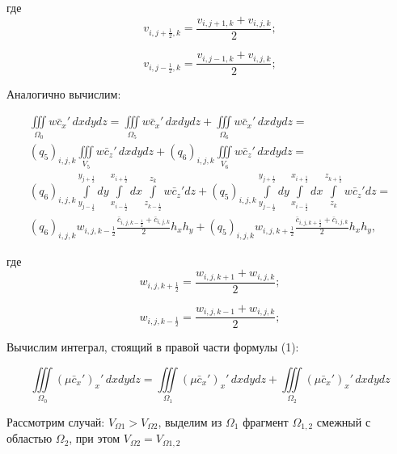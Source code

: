 \documentclass[12pt]{article}
\begin{document}
где 
\begin{equation*} 
	v_{{i,j+\frac{1}{2}},k} = \frac{v_{i,j+1,k}+v_{i,j,k}}{2};
\end{equation*}

\begin{equation*} 
	v_{{i,j-\frac{1}{2}},k} = \frac{v_{i,j-1,k}+v_{i,j,k}}{2};
\end{equation*}

Аналогично вычислим:

\begin{multline*}
	\iiint\limits_{\Omega_0} w\bar{c}_x'\,dxdydz = \iiint\limits_{\Omega_5} w\bar{c}_x'\,dxdydz + \iiint\limits_{\Omega_6} w\bar{c}_x'\,dxdydz = \\
	(q_5)_{i,j,k}\iiint\limits_{V_5} w\bar{c}_z'\,dxdydz +
	(q_6)_{i,j,k}\iiint\limits_{V_6} w\bar{c}_z'\,dxdydz = \\
	(q_6)_{i,j,k}\int\limits_{y_{j-\frac{1}{2}}}^{y_{j+\frac{1}{2}}}dy\int\limits_{x_{i-\frac{1}{2}}}^{x_{i+\frac{1}{2}}}dx\int\limits_{z_{k-\frac{1}{2}}}^{z_k}w\bar{c}_z'dz + (q_5)_{i,j,k}\int\limits_{y_{j-\frac{1}{2}}}^{y_{j+\frac{1}{2}}}dy\int\limits_{x_{i-\frac{1}{2}}}^{x_{i+\frac{1}{2}}}dx\int\limits_{z_k}^{z_{k+\frac{1}{2}}}w\bar{c}_z'dz = \\
	(q_6)_{i,j,k}w_{i,j,k-\frac{1}{2}}\frac{\bar{c}_{i,j,k-\frac{1}{2}}+\bar{c}_{i,j,k}}{2}h_xh_y + (q_5)_{i,j,k}w_{i,j,k+\frac{1}{2}}\frac{\bar{c}_{i,j,k+\frac{1}{2}}+\bar{c}_{i,j,k}}{2}h_xh_y,
\end{multline*}

где 
\begin{equation*} 
	w_{{i,j},k+\frac{1}{2}} = \frac{w_{i,j,k+1}+w_{i,j,k}}{2};
\end{equation*}

\begin{equation*} 
	w_{{i,j},k-\frac{1}{2}} = \frac{w_{i,j,k-1}+w_{i,j,k}}{2};
\end{equation*}

Вычислим интеграл, стоящий в правой части формулы (1):

\begin{equation*} 
	\iiint\limits_{\Omega_0} (\mu\bar{c}_x')_x'\,dxdydz = \iiint\limits_{\Omega_1} (\mu\bar{c}_x')_x'\,dxdydz + \iiint\limits_{\Omega_2} (\mu\bar{c}_x')_x'\,dxdydz
\end{equation*}

Рассмотрим случай: $V_{\Omega1}>V_{\Omega2}$, выделим из  $\Omega_1$ фрагмент $\Omega_{1,2}$ смежный  с областью $\Omega_2$,  при этом   $V_{\Omega2}=V_{\Omega{1,2}}$
\end{document}
